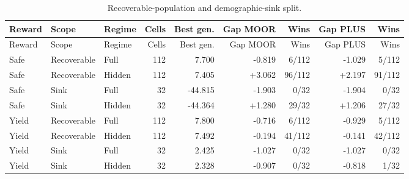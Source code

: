 \begin{longtable}{lllrrrrrr}
\caption{Recoverable-population and demographic-sink split.}\label{tab:recoverability}\\
\toprule
Reward & Scope & Regime & Cells & Best gen. & Gap MOOR & Wins & Gap PLUS & Wins \\
\midrule
\endfirsthead
\toprule
Reward & Scope & Regime & Cells & Best gen. & Gap MOOR & Wins & Gap PLUS & Wins \\
\midrule
\endhead
Safe & Recoverable & Full & 112 & 7.700 & -0.819 & 6/112 & -1.029 & 5/112 \\
Safe & Recoverable & Hidden & 112 & 7.405 & +3.062 & 96/112 & +2.197 & 91/112 \\
Safe & Sink & Full & 32 & -44.815 & -1.903 & 0/32 & -1.904 & 0/32 \\
Safe & Sink & Hidden & 32 & -44.364 & +1.280 & 29/32 & +1.206 & 27/32 \\
Yield & Recoverable & Full & 112 & 7.800 & -0.716 & 6/112 & -0.929 & 5/112 \\
Yield & Recoverable & Hidden & 112 & 7.492 & -0.194 & 41/112 & -0.141 & 42/112 \\
Yield & Sink & Full & 32 & 2.425 & -1.027 & 0/32 & -1.027 & 0/32 \\
Yield & Sink & Hidden & 32 & 2.328 & -0.907 & 0/32 & -0.818 & 1/32 \\
\bottomrule
\end{longtable}
